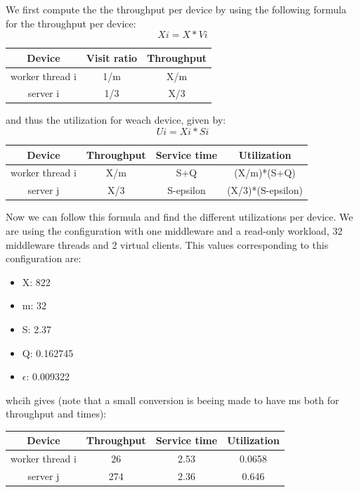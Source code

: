 \documentclass[11pt,a4paper]{article}
\begin{document}
We first compute the the throughput per device by using the following formula for the throughput per device: 
\[Xi = X*Vi\]
 \begin{center}

		\begin{tabular}{|c|c|c|}
			  \hline
			  \textbf{Device} & \textbf{Visit ratio} & \textbf{Throughput} \\
			  \hline
			  worker thread i  & 1/m & X/m \\
			  server i & 1/3 & X/3   \\
			  \hline
		\end{tabular}
 \end{center}
and thus the utilization for weach device, given by:
\[Ui = Xi*Si\]
  \begin{center}

		\begin{tabular}{|c|c|c|c|}
			  \hline
			  \textbf{Device} & \textbf{Throughput} & \textbf{Service time} & \textbf{Utilization} \\
			  \hline
			  worker thread i  &X/m  & S+Q  &(X/m)*(S+Q)\\
			  server j & X/3 & S-epsilon &(X/3)*(S-epsilon)  \\
			  \hline
		\end{tabular}
 \end{center}
Now we can follow this formula and find the different utilizations per device. We are using the configuration with one middleware and a read-only workload, 32 middleware threads and 2 virtual clients. This values corresponding to this configuration are: 
\begin{itemize}
\item X: 822
\item m: 32
\item S: 2.37
\item Q: 0.162745
\item \(\epsilon \): 0.009322
\end{itemize}
whcih gives (note that a small conversion is beeing made to have ms both for throughput and times):
  \begin{center}
		\begin{tabular}{|c|c|c|c|}
			  \hline
			  \textbf{Device} & \textbf{Throughput} & \textbf{Service time} & \textbf{Utilization} \\
			  \hline
			  worker thread i  &26  & 2.53  &0.0658\\
			  server j & 274 & 2.36 &0.646  \\
			  \hline
		\end{tabular}
 \end{center}
\end{document}
